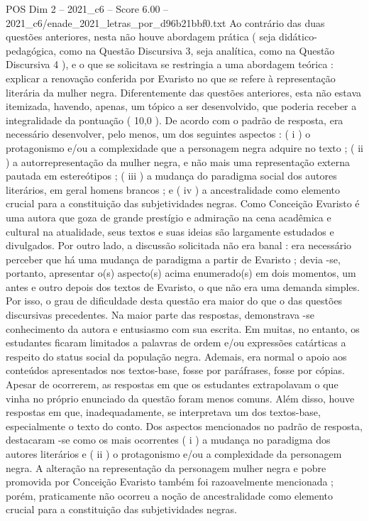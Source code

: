 \begin{textsample}{POS Dim 2 – 2021\_c6 – Score 6.00 – 2021\_c6/enade\_2021\_letras\_por\_d96b21bbf0.txt}
Ao contrário das duas questões anteriores, nesta não houve abordagem prática ( seja didático-pedagógica, como na Questão Discursiva 3, seja analítica, como na Questão Discursiva 4 ), e o que se solicitava se restringia a uma abordagem teórica : explicar a renovação conferida por Evaristo no que se refere à representação literária da mulher negra.
Diferentemente das questões anteriores, esta não estava itemizada, havendo, apenas, um tópico a ser desenvolvido, que poderia receber a integralidade da pontuação ( 10,0 ).
De acordo com o padrão de resposta, era necessário desenvolver, pelo menos, um dos seguintes aspectos : ( i ) o protagonismo e/ou a complexidade que a personagem negra adquire no texto ; ( ii ) a autorrepresentação da mulher negra, e não mais uma representação externa pautada em estereótipos ; ( iii ) a mudança do paradigma social dos autores literários, em geral homens brancos ; e ( iv ) a ancestralidade como elemento crucial para a constituição das subjetividades negras.
Como Conceição Evaristo é uma autora que goza de grande prestígio e admiração na cena acadêmica e cultural na atualidade, seus textos e suas ideias são largamente estudados e divulgados.
Por outro lado, a discussão solicitada não era banal : era necessário perceber que há uma mudança de paradigma a partir de Evaristo ; devia -se, portanto, apresentar o(s) aspecto(s) acima enumerado(s) em dois momentos, um antes e outro depois dos textos de Evaristo, o que não era uma demanda simples.
Por isso, o grau de dificuldade desta questão era maior do que o das questões discursivas precedentes.
Na maior parte das respostas, demonstrava -se conhecimento da autora e entusiasmo com sua escrita.
Em muitas, no entanto, os estudantes ficaram limitados a palavras de ordem e/ou expressões catárticas a respeito do status social da população negra.
Ademais, era normal o apoio aos conteúdos apresentados nos textos-base, fosse por paráfrases, fosse por cópias.
Apesar de ocorrerem, as respostas em que os estudantes extrapolavam o que vinha no próprio enunciado da questão foram menos comuns.
Além disso, houve respostas em que, inadequadamente, se interpretava um dos textos-base, especialmente o texto do conto.
Dos aspectos mencionados no padrão de resposta, destacaram -se como os mais ocorrentes ( i ) a mudança no paradigma dos autores literários e ( ii ) o protagonismo e/ou a complexidade da personagem negra.
A alteração na representação da personagem mulher negra e pobre promovida por Conceição Evaristo também foi razoavelmente mencionada ; porém, praticamente não ocorreu a noção de ancestralidade como elemento crucial para a constituição das subjetividades negras.

\end{textsample}
